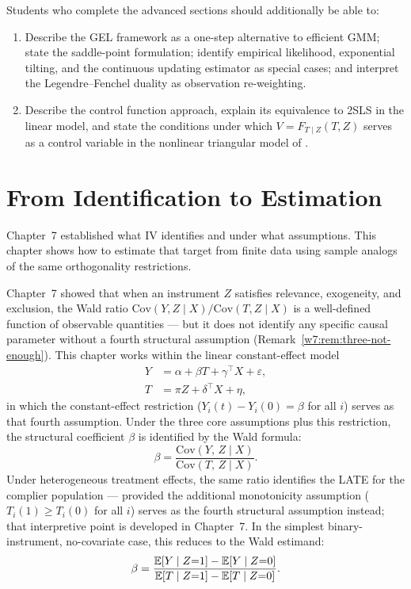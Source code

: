 \documentclass[master.tex]{subfiles}
\begin{document}
\begin{tcolorbox}[remarkstyle, title={Learning Objectives --- Advanced
  Enrichment (\S\S\,\ref{w12:sec:gel}--\ref{w12:sec:cf})}]
Students who complete the advanced sections should additionally be
able to:
\begin{enumerate}
  \item Describe the GEL framework as a one-step alternative to
    efficient GMM; state the saddle-point formulation; identify
    empirical likelihood, exponential tilting, and the continuous
    updating estimator as special cases; and interpret the
    Legendre--Fenchel duality as observation re-weighting.
  \item Describe the control function approach, explain its
    equivalence to 2SLS in the linear model, and state the conditions
    under which $V = F_{T \mid Z}(T, Z)$ serves as a control
    variable in the nonlinear triangular model of \citet{imbens2009}.
\end{enumerate}
\end{tcolorbox}


\section{From Identification to Estimation}
\label{w12:sec:intro}

Chapter~7 established what IV identifies and under what assumptions.
This chapter shows how to estimate that target from finite data using
sample analogs of the same orthogonality restrictions.

Chapter~7 showed that when an instrument $Z$ satisfies relevance,
exogeneity, and exclusion, the Wald ratio
$\mathrm{Cov}(Y,Z\mid X)/\mathrm{Cov}(T,Z\mid X)$ is a well-defined
function of observable quantities --- but it does not identify any
specific causal parameter without a fourth structural assumption
(Remark~\ref{w7:rem:three-not-enough}).  This chapter works within
the linear constant-effect model
\begin{align}
  Y &= \alpha + \beta T + \gamma^\top X + \varepsilon,
  \label{w12:eq:structural}\\
  T &= \pi Z + \delta^\top X + \eta,
  \label{w12:eq:firststage}
\end{align}
in which the constant-effect restriction ($Y_i(t)-Y_i(0) = \beta$
for all $i$) serves as that fourth assumption.  Under the three core
assumptions plus this restriction, the structural coefficient $\beta$
is identified by the Wald formula:
\[
  \beta
  = \frac{\mathrm{Cov}(Y,\,Z \mid X)}{\mathrm{Cov}(T,\,Z \mid X)}.
\]
Under heterogeneous treatment effects, the same ratio identifies the
LATE for the complier population --- provided the additional
monotonicity assumption ($T_i(1) \geq T_i(0)$ for all $i$) serves
as the fourth structural assumption instead; that interpretive point
is developed in Chapter~7.
In the simplest binary-instrument, no-covariate case, this reduces to
the Wald estimand:
\[
  \beta
  = \frac{\mathbb{E}[Y \mid Z{=}1] - \mathbb{E}[Y \mid Z{=}0]}
         {\mathbb{E}[T \mid Z{=}1] - \mathbb{E}[T \mid Z{=}0]}.
\]
\end{document}
